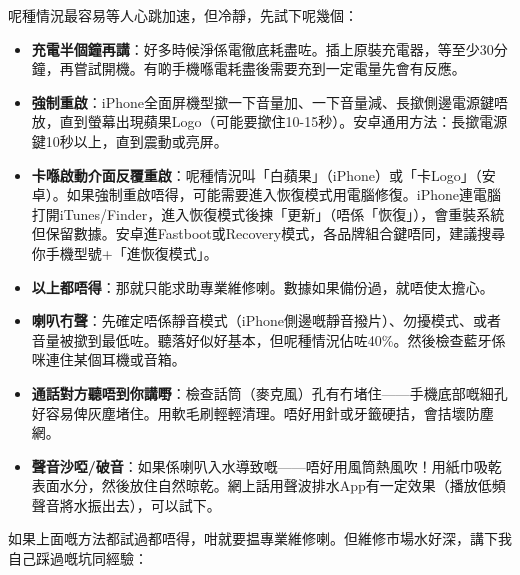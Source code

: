 
呢種情況最容易等人心跳加速，但冷靜，先試下呢幾個：

\begin{itemize}
  \item \textbf{充電半個鐘再講}：好多時候淨係電徹底耗盡咗。插上原裝充電器，等至少30分鐘，再嘗試開機。有啲手機喺電耗盡後需要充到一定電量先會有反應。
  \item \textbf{強制重啟}：iPhone全面屏機型撳一下音量加、一下音量減、長撳側邊電源鍵唔放，直到螢幕出現蘋果Logo（可能要撳住10-15秒）。安卓通用方法：長撳電源鍵10秒以上，直到震動或亮屏。
  \item \textbf{卡喺啟動介面反覆重啟}：呢種情況叫「白蘋果」（iPhone）或「卡Logo」（安卓）。如果強制重啟唔得，可能需要進入恢復模式用電腦修復。iPhone連電腦打開iTunes/Finder，進入恢復模式後揀「更新」（唔係「恢復」），會重裝系統但保留數據。安卓進Fastboot或Recovery模式，各品牌組合鍵唔同，建議搜尋你手機型號+「進恢復模式」。
  \item \textbf{以上都唔得}：那就只能求助專業維修喇。數據如果備份過，就唔使太擔心。
\end{itemize}


\begin{itemize}
  \item \textbf{喇叭冇聲}：先確定唔係靜音模式（iPhone側邊嘅靜音撥片）、勿擾模式、或者音量被撳到最低咗。聽落好似好基本，但呢種情況佔咗40\%。然後檢查藍牙係咪連住某個耳機或音箱。
  \item \textbf{通話對方聽唔到你講嘢}：檢查話筒（麥克風）孔有冇堵住——手機底部嘅細孔好容易俾灰塵堵住。用軟毛刷輕輕清理。唔好用針或牙籤硬拮，會拮壞防塵網。
  \item \textbf{聲音沙啞/破音}：如果係喇叭入水導致嘅——唔好用風筒熱風吹！用紙巾吸乾表面水分，然後放住自然晾乾。網上話用聲波排水App有一定效果（播放低頻聲音將水振出去），可以試下。
\end{itemize}


如果上面嘅方法都試過都唔得，咁就要揾專業維修喇。但維修市場水好深，講下我自己踩過嘅坑同經驗：

